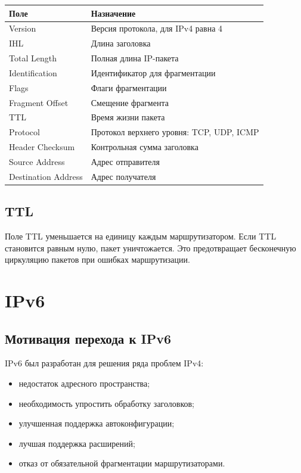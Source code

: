 \documentclass[12pt,a4paper]{article}
\begin{document}
\begin{center}
\begin{tabular}{|p{4cm}|p{9cm}|}
\hline
\textbf{Поле} & \textbf{Назначение} \\
\hline
Version & Версия протокола, для IPv4 равна 4 \\
\hline
IHL & Длина заголовка \\
\hline
Total Length & Полная длина IP-пакета \\
\hline
Identification & Идентификатор для фрагментации \\
\hline
Flags & Флаги фрагментации \\
\hline
Fragment Offset & Смещение фрагмента \\
\hline
TTL & Время жизни пакета \\
\hline
Protocol & Протокол верхнего уровня: TCP, UDP, ICMP \\
\hline
Header Checksum & Контрольная сумма заголовка \\
\hline
Source Address & Адрес отправителя \\
\hline
Destination Address & Адрес получателя \\
\hline
\end{tabular}
\end{center}

\subsection{TTL}

Поле TTL уменьшается на единицу каждым маршрутизатором. Если TTL становится равным нулю, пакет уничтожается. Это предотвращает бесконечную циркуляцию пакетов при ошибках маршрутизации.

\section{IPv6}

\subsection{Мотивация перехода к IPv6}

IPv6 был разработан для решения ряда проблем IPv4:

\begin{itemize}
    \item недостаток адресного пространства;
    \item необходимость упростить обработку заголовков;
    \item улучшенная поддержка автоконфигурации;
    \item лучшая поддержка расширений;
    \item отказ от обязательной фрагментации маршрутизаторами.
\end{itemize}
\end{document}
